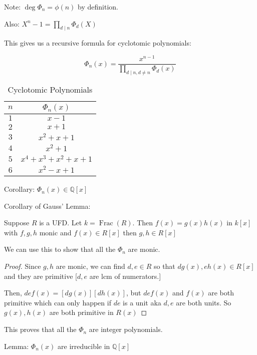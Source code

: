 \documentclass{article}
\theoremstyle{definition}
\begin{document}
Note: \(\deg\Phi_n=\phi(n)\) by definition.

Also: \(\displaystyle X^n - 1 = \prod_{d \mid n}^{} \Phi_d(X)  \)

This gives us a recursive formula for cyclotomic polynomials:

\[
    \Phi_n(x) = \frac{x^{n-1}}{\prod_{d\mid n,d \neq n}\Phi_d(x)}
\]

\begin{table}[H]
    \centering
    \begin{tabular}{c|c}
        \toprule
            \(n\)  &  \(\Phi_n(x)\)  \\
        \midrule
            \(1\)  &  \(x-1\)  \\
            \(2\)  &  \(x+1\)  \\
            \(3\)  &  \(x^2 + x + 1\)  \\
            \(4\)  &  \(x^2 + 1\)  \\
            \(5\)  &  \(x^4 + x^3 + x^2 + x + 1\)  \\
            \(6\)  &  \(x^2 - x + 1\)  \\
        \bottomrule
    \end{tabular}
    \caption{Cyclotomic Polynomials}
    \label{tab:cyclo}
\end{table}

Corollary: \(\Phi_n(x)\in \mathbb{Q} [x]\) 

Corollary of Gauss' Lemma:

Suppose \(R\) is a UFD. Let \(k=\operatorname{Frac}(R) \). Then \(f(x)=g(x)h(x)\) in \(k[x]\) with \(f,g,h\) monic and \(f(x)\in R[x]\) then \(g,h\in R[x]\) 

We can use this to show that all the \(\Phi_n\) are monic.

\begin{proof}
    Since \(g,h\) are monic, we can find \(d,e\in R\) so that \(dg(x),eh(x)\in R[x]\) and they are primitive [\(d,e\) are lcm of numerators.]
    
    Then, \(def(x)=[dg(x)][dh(x)]\), but \(def(x)\) and \(f(x)\) are both primitive which can only happen if \(de\) is a unit aka \(d,e\) are both units. So \(g(x),h(x)\) are both primitive in \(R(x)\) 

\end{proof}

This proves that all the \(\Phi_n\) are integer polynomials.

Lemma: \(\Phi_n(x)\) are irreducible in \(\mathbb{Q}[x]\) 
\end{document}
